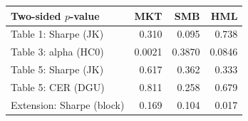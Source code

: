 \begin{tabular}{lrrr}\toprule
Two-sided $p$-value & MKT & SMB & HML \\ \midrule
Table 1: Sharpe (JK) & 0.310 & 0.095 & 0.738 \\
Table 3: alpha (HC0) & 0.0021 & 0.3870 & 0.0846 \\
Table 5: Sharpe (JK) & 0.617 & 0.362 & 0.333 \\
Table 5: CER (DGU) & 0.811 & 0.258 & 0.679 \\
Extension: Sharpe (block) & 0.169 & 0.104 & 0.017 \\
\bottomrule\end{tabular}
